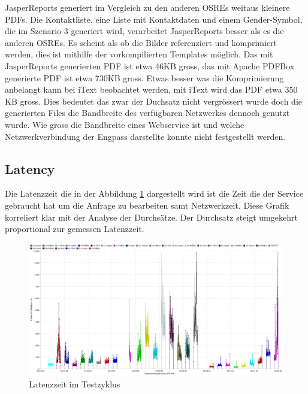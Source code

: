 \documentclass[main.tex]{subfiles}
\begin{document}
JasperReports generiert im Vergleich zu den anderen OSREs weitaus kleinere PDFs. Die Kontaktliste, eine Liste mit  Kontaktdaten und einem Gender-Symbol, die im Szenario 3 generiert wird, verarbeitet JasperReports besser als es die anderen OSREs. Es scheint als ob die Bilder referenziert und komprimiert werden, dies ist mithilfe der vorkompilierten Templates möglich. Das mit JasperReports generierten PDF ist etwa 46KB gross, das mit Apache PDFBox generierte PDF ist etwa 730KB gross. Etwas besser was die Komprimierung anbelangt kann bei iText beobachtet werden, mit iText wird das PDF etwa 350 KB gross.  
Dies bedeutet das zwar der Duchsatz nicht vergrössert wurde doch die generierten Files die Bandbreite des verfügbaren Netzwerkes dennoch genutzt wurde. Wie gross die Bandbreite eines Webservice ist und welche Netzwerkverbindung der Engpass darstellte konnte nicht festgestellt werden. 


\subsection{Latency}
Die Latenzzeit die in der Abbildung \ref{figure:latencyTestcycle} dargestellt wird ist die Zeit die der Service gebraucht hat um die Anfrage zu bearbeiten samt Netzwerkzeit. 
Diese Grafik korreliert klar mit der Analyse der Durchsätze. Der Durchsatz steigt umgekehrt proportional zur gemessen Latenzzeit. 


\begin{figure}[!ht]
\includegraphics[width=\textwidth]{mainpart/4_analyse_img/ResponseLatenciesOverTime.png}
 \caption{Latenzzeit im Testzyklus}
 \label{figure:latencyTestcycle}
\end{figure}
\end{document}
